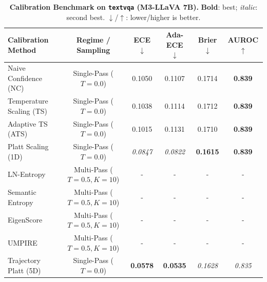 \begin{table}[t]
\setlength{\tabcolsep}{4pt}
\renewcommand{\arraystretch}{1.05}
\centering
\footnotesize
\begin{tabular}{lccccc}
\toprule
\textbf{Calibration Method} & \textbf{Regime / Sampling} & \textbf{ECE} $\downarrow$ & \textbf{Ada-ECE} $\downarrow$ & \textbf{Brier} $\downarrow$ & \textbf{AUROC} $\uparrow$ \\
\midrule
Naive Confidence (NC) & Single-Pass ($T = 0.0$) & 0.1050 & 0.1107 & 0.1714 & \textbf{0.839} \\
Temperature Scaling (TS) & Single-Pass ($T = 0.0$) & 0.1038 & 0.1114 & 0.1712 & \textbf{0.839} \\
Adaptive TS (ATS) & Single-Pass ($T = 0.0$) & 0.1015 & 0.1131 & 0.1710 & \textbf{0.839} \\
Platt Scaling (1D) & Single-Pass ($T = 0.0$) & \textit{0.0847} & \textit{0.0822} & \textbf{0.1615} & \textbf{0.839} \\
LN-Entropy & Multi-Pass ($T = 0.5, K = 10$) & - & - & - & - \\
Semantic Entropy & Multi-Pass ($T = 0.5, K = 10$) & - & - & - & - \\
EigenScore & Multi-Pass ($T = 0.5, K = 10$) & - & - & - & - \\
UMPIRE & Multi-Pass ($T = 0.5, K = 10$) & - & - & - & - \\
Trajectory Platt (5D) & Single-Pass ($T = 0.0$) & \textbf{0.0578} & \textbf{0.0535} & \textit{0.1628} & \textit{0.835} \\
\bottomrule
\end{tabular}
\caption{\textbf{Calibration Benchmark on \texttt{textvqa} (M3-LLaVA 7B).} \textbf{Bold}: best; \textit{italic}: second best. $\downarrow$/$\uparrow$: lower/higher is better.}
\label{tab:benchmark_m3_textvqa}
\end{table}

